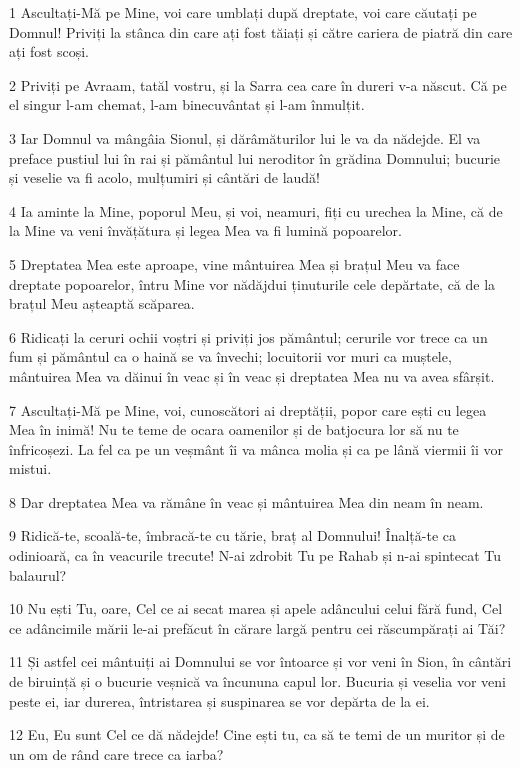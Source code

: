 \par 1 Ascultați-Mă pe Mine, voi care umblați după dreptate, voi care căutați pe Domnul! Priviți la stânca din care ați fost tăiați și către cariera de piatră din care ați fost scoși.
\par 2 Priviți pe Avraam, tatăl vostru, și la Sarra cea care în dureri v-a născut. Că pe el singur l-am chemat, l-am binecuvântat și l-am înmulțit.
\par 3 Iar Domnul va mângâia Sionul, și dărâmăturilor lui le va da nădejde. El va preface pustiul lui în rai și pământul lui neroditor în grădina Domnului; bucurie și veselie va fi acolo, mulțumiri și cântări de laudă!
\par 4 Ia aminte la Mine, poporul Meu, și voi, neamuri, fiți cu urechea la Mine, că de la Mine va veni învățătura și legea Mea va fi lumină popoarelor.
\par 5 Dreptatea Mea este aproape, vine mântuirea Mea și brațul Meu va face dreptate popoarelor, întru Mine vor nădăjdui ținuturile cele depărtate, că de la brațul Meu așteaptă scăparea.
\par 6 Ridicați la ceruri ochii voștri și priviți jos pământul; cerurile vor trece ca un fum și pământul ca o haină se va învechi; locuitorii vor muri ca muștele, mântuirea Mea va dăinui în veac și în veac și dreptatea Mea nu va avea sfârșit.
\par 7 Ascultați-Mă pe Mine, voi, cunoscători ai dreptății, popor care ești cu legea Mea în inimă! Nu te teme de ocara oamenilor și de batjocura lor să nu te înfricoșezi. La fel ca pe un veșmânt îi va mânca molia și ca pe lână viermii îi vor mistui.
\par 8 Dar dreptatea Mea va rămâne în veac și mântuirea Mea din neam în neam.
\par 9 Ridică-te, scoală-te, îmbracă-te cu tărie, braț al Domnului! Înalță-te ca odinioară, ca în veacurile trecute! N-ai zdrobit Tu pe Rahab și n-ai spintecat Tu balaurul?
\par 10 Nu ești Tu, oare, Cel ce ai secat marea și apele adâncului celui fără fund, Cel ce adâncimile mării le-ai prefăcut în cărare largă pentru cei răscumpărați ai Tăi?
\par 11 Și astfel cei mântuiți ai Domnului se vor întoarce și vor veni în Sion, în cântări de biruință și o bucurie veșnică va încununa capul lor. Bucuria și veselia vor veni peste ei, iar durerea, întristarea și suspinarea se vor depărta de la ei.
\par 12 Eu, Eu sunt Cel ce dă nădejde! Cine ești tu, ca să te temi de un muritor și de un om de rând care trece ca iarba?
